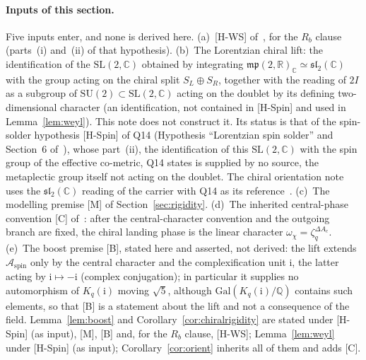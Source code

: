 \documentclass[11pt]{article}
\theoremstyle{definition}
\theoremstyle{remark}
\newcommand{\Gal}{\mathrm{Gal}}
\begin{document}
    \paragraph{Inputs of this section.}
    Five inputs enter, and none is derived here.
    (a)~[H-WS] of~\cite{Beau2026q11of}, for the $R_b$ clause (parts~(i) and~(ii) of that hypothesis).
    (b)~The Lorentzian chiral lift: the identification of the $\mathrm{SL}(2,\mathbb{C})$ obtained by integrating
$\mathfrak{mp}(2,\mathbb{R})_{\mathbb{C}}\simeq\mathfrak{sl}_2(\mathbb{C})$ with the group acting on the chiral
split $S_L\oplus S_R$, together with the reading of $2I$ as a subgroup of $\mathrm{SU}(2)\subset\mathrm{SL}(2,\mathbb{C})$
acting on the doublet by its defining two-dimensional character (an identification, not contained in [H-Spin] and
used in Lemma~\ref{lem:weyl}).
    This note does not construct it.
    Its status is that of the spin-solder hypothesis [H-Spin] of Q14 (Hypothesis ``Lorentzian spin solder'' and
    Section~6 of~\cite{Beau2026q14}), whose part~(ii), the identification of this $\mathrm{SL}(2,\mathbb{C})$ with the
    spin group of the effective co-metric, Q14 states is supplied by no source, the metaplectic group itself not acting
    on the doublet.
    The chiral orientation note uses the $\mathfrak{sl}_2(\mathbb{C})$ reading of the carrier with Q14 as its
    reference~\cite{Beau2026cho}.
    (c)~The modelling premise [M] of Section~\ref{sec:rigidity}.
    (d)~The inherited central-phase convention [C] of~\cite{Beau2026cho}: after the central-character convention and the
outgoing branch are fixed, the chiral landing phase is the linear character $\omega_\chi=\zeta_q^{\Delta A_c}$.
(e)~The boost premise [B], stated here and asserted, not derived: the lift extends $\mathcal{A}_{\mathrm{spin}}$ only
by the central character and the complexification unit $\mathrm{i}$, the latter acting by $\mathrm{i}\mapsto-\mathrm{i}$
(complex conjugation); in particular it supplies no automorphism of $K_q(\mathrm{i})$ moving $\sqrt{5}$, although
$\Gal(K_q(\mathrm{i})/\mathbb{Q})$ contains such elements, so that [B] is a statement about the lift and not a
consequence of the field.
Lemma~\ref{lem:boost} and Corollary~\ref{cor:chiralrigidity} are stated under [H-Spin] (as input), [M], [B] and, for
the $R_b$ clause, [H-WS]; Lemma~\ref{lem:weyl} under [H-Spin] (as input); Corollary~\ref{cor:orient} inherits all of
them and adds [C].
\end{document}
